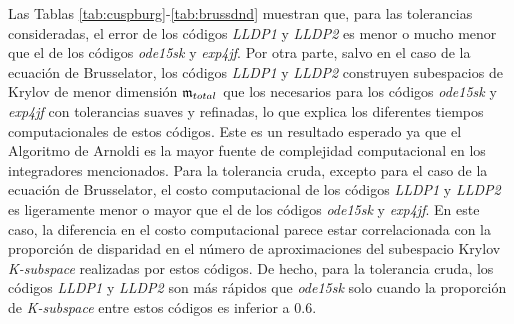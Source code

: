 Las Tablas \ref{tab:cuspburg}-\ref{tab:brussdnd} muestran que, para las tolerancias consideradas, el error de los códigos \emph{LLDP1} y \emph{LLDP2} es menor o mucho menor que el de los códigos \emph{ode15sk} y \emph{exp4jf}. Por otra parte, salvo en el caso de la ecuación de Brusselator, los códigos \emph{LLDP1} y \emph{LLDP2} construyen subespacios de Krylov de menor dimensión $\mathfrak{m}_{total}$ que los necesarios para los códigos \emph{ode15sk } y \emph{exp4jf} con tolerancias suaves y refinadas, lo que explica los diferentes tiempos computacionales de estos códigos. Este es un resultado esperado ya que el Algoritmo de Arnoldi es la mayor fuente de complejidad computacional en los integradores mencionados. Para la tolerancia cruda, excepto para el caso de la ecuación de Brusselator, el costo computacional de los códigos \emph{LLDP1} y \emph{LLDP2} es ligeramente menor o mayor que el de los códigos \emph{ode15sk} y \emph{ exp4jf}. En este caso, la diferencia en el costo computacional parece estar correlacionada con la proporción de disparidad en el número de aproximaciones del subespacio Krylov \textit{K-subspace} realizadas por estos códigos. De hecho, para la tolerancia cruda, los códigos \emph{LLDP1} y \emph{LLDP2} son más rápidos que \emph{ode15sk} solo cuando la proporción de \textit{K-subspace} entre estos códigos es inferior a $0.6$.

